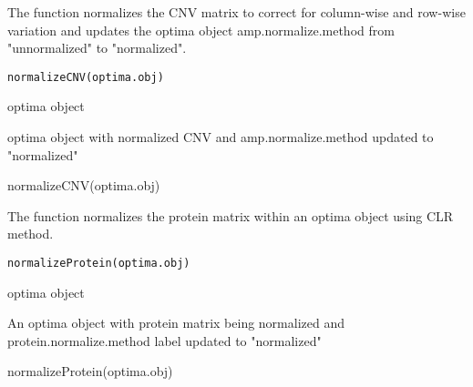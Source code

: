 \documentclass[a4paper]{book}
\begin{document}
%
\begin{Description}\relax
The function normalizes the CNV matrix to correct for column-wise and row-wise variation and
updates the optima object amp.normalize.method from "unnormalized" to "normalized".
\end{Description}
%
\begin{Usage}
\begin{verbatim}
normalizeCNV(optima.obj)
\end{verbatim}
\end{Usage}
%
\begin{Arguments}
\begin{ldescription}
\item[\code{optima.obj}] optima object
\end{ldescription}
\end{Arguments}
%
\begin{Value}
optima object with normalized CNV and amp.normalize.method updated to "normalized"
\end{Value}
%
\begin{Examples}
\begin{ExampleCode}
normalizeCNV(optima.obj)
\end{ExampleCode}
\end{Examples}
%
\begin{Description}\relax
The function normalizes the protein matrix within an optima object using
CLR method.
\end{Description}
%
\begin{Usage}
\begin{verbatim}
normalizeProtein(optima.obj)
\end{verbatim}
\end{Usage}
%
\begin{Arguments}
\begin{ldescription}
\item[\code{optima.obj}] optima object
\end{ldescription}
\end{Arguments}
%
\begin{Value}
An optima object with protein matrix being normalized and
protein.normalize.method label updated to "normalized"
\end{Value}
%
\begin{Examples}
\begin{ExampleCode}
normalizeProtein(optima.obj)
\end{ExampleCode}
\end{Examples}
\end{document}
